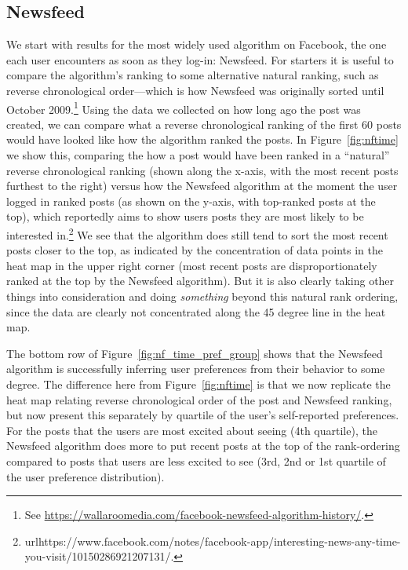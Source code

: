 \documentclass[12pt,letterpaper]{article}
\begin{document}
\subsection{Newsfeed}
We start with results for the most widely used algorithm on Facebook, the one each user encounters as soon as they log-in: Newsfeed. For starters it is useful to compare the algorithm's ranking to some alternative natural ranking, such as reverse chronological order---which is how Newsfeed was originally sorted until October 2009.\footnote{See \url{https://wallaroomedia.com/facebook-newsfeed-algorithm-history/}.} Using the data we collected on how long ago the post was created, we can compare what a reverse chronological ranking of the first 60 posts would have looked like how the algorithm ranked the posts. In Figure~\ref{fig:nftime} we show this, comparing the how a post would have been ranked in a ``natural'' reverse chronological ranking (shown along the x-axis, with the most recent posts furthest to the right) versus how the Newsfeed algorithm at the moment the user logged in ranked posts (as shown on the y-axis, with top-ranked posts at the top), which reportedly aims to show users posts they are most likely to be interested in.\footnote{url{https://www.facebook.com/notes/facebook-app/interesting-news-any-time-you-visit/10150286921207131/}.} We see that the algorithm does still tend to sort the most recent posts closer to the top, as indicated by the concentration of data points in the heat map in the upper right corner (most recent posts are disproportionately ranked at the top by the Newsfeed algorithm). But it is also clearly taking other things into consideration and doing \emph{something} beyond this natural rank ordering, since the data are clearly not concentrated along the 45 degree line in the heat map.




The bottom row of Figure~\ref{fig:nf_time_pref_group} shows that the Newsfeed algorithm is successfully inferring user preferences from their behavior to some degree. The difference here from Figure~\ref{fig:nftime} is that we now replicate the heat map relating reverse chronological order of the post and Newsfeed ranking, but now present this separately by quartile of the user's self-reported preferences.  For the posts that the users are most excited about seeing (4th quartile), the Newsfeed algorithm does more to put recent posts at the top of the rank-ordering compared to posts that users are less excited to see (3rd, 2nd or 1st quartile of the user preference distribution).
\end{document}
